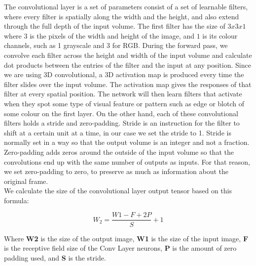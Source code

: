 The convolutional layer is a set of parameters consist of a set of learnable filters, where every filter is spatially along the width and the height, and also extend through the full depth of the input volume. The first filter has the size of $3x3x1$ where $3$ is the pixels of the width and height of the image, and $1$ is its colour channels, such as 1 grayscale and 3 for RGB. During the forward pass, we convolve each filter across the height and width of the input volume and calculate dot products between the entries of the filter and the input at any position. Since we are using 3D convolutional, a 3D activation map is produced every time the filter slides over the input volume. The activation map gives the responses of that filter at every spatial position. The network will then learn filters that activate when they spot some type of visual feature or pattern such as edge or blotch of some colour on the first layer. On the other hand, each of these convolutional filters holds a stride and zero-padding. Stride is an instruction for the filter to shift at a certain unit at a time, in our case we set the stride to 1. Stride is normally set in a way so that the output volume is an integer and not a fraction. Zero-padding adds zeros around the outside of the input volume so that the convolutions end up with the same number of outputs as inputs. For that reason, we set zero-padding to zero, to preserve as much as information about the original frame.\\
We calculate the size of the convolutional layer output tensor based on this formula: 

\begin{equation}
    W_{2}=\frac{W1-F+2P}{S} +1
\end{equation}

\hspace{5mm} Where \textbf{W2} is the size of the output image, \textbf{W1} is the size of the input image, \textbf{F} is the receptive field size of the Conv Layer neurons, \textbf{P} is the amount of zero padding used, and \textbf{S} is the stride.\\

